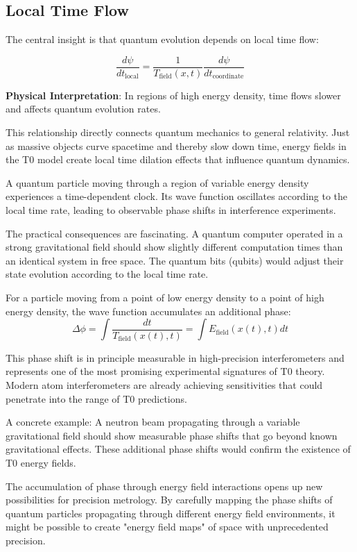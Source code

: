 \documentclass[12pt,a4paper]{article}
\theoremstyle{definition}
\theoremstyle{remark}
\begin{document}
\subsection{Local Time Flow}

The central insight is that quantum evolution depends on local time flow:

\begin{equation}
	\frac{d\psi}{dt_{\text{local}}} = \frac{1}{T_{\text{field}}(x,t)} \frac{d\psi}{dt_{\text{coordinate}}}
	\label{eq:local_time_flow}
\end{equation}

\textbf{Physical Interpretation}: In regions of high energy density, time flows slower and affects quantum evolution rates.

This relationship directly connects quantum mechanics to general relativity. Just as massive objects curve spacetime and thereby slow down time, energy fields in the T0 model create local time dilation effects that influence quantum dynamics.

A quantum particle moving through a region of variable energy density experiences a time-dependent clock. Its wave function oscillates according to the local time rate, leading to observable phase shifts in interference experiments.

The practical consequences are fascinating. A quantum computer operated in a strong gravitational field should show slightly different computation times than an identical system in free space. The quantum bits (qubits) would adjust their state evolution according to the local time rate.

For a particle moving from a point of low energy density to a point of high energy density, the wave function accumulates an additional phase:
$$\Delta \phi = \int \frac{dt}{T_{\text{field}}(x(t), t)} = \int E_{\text{field}}(x(t), t) dt$$

This phase shift is in principle measurable in high-precision interferometers and represents one of the most promising experimental signatures of T0 theory. Modern atom interferometers are already achieving sensitivities that could penetrate into the range of T0 predictions.

A concrete example: A neutron beam propagating through a variable gravitational field should show measurable phase shifts that go beyond known gravitational effects. These additional phase shifts would confirm the existence of T0 energy fields.

The accumulation of phase through energy field interactions opens up new possibilities for precision metrology. By carefully mapping the phase shifts of quantum particles propagating through different energy field environments, it might be possible to create "energy field maps" of space with unprecedented precision.
\end{document}

